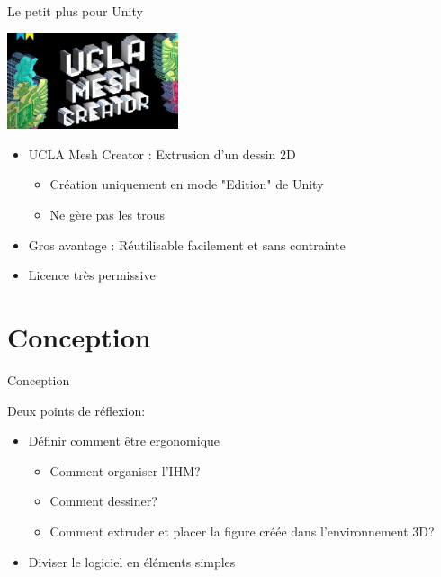 \documentclass[a4paper,10pt]{beamer}
\begin{document}
		\begin{frame}{Le petit plus pour Unity}
			\centerline{\includegraphics[height=80pt]{images/techno/ucla.jpg}}
			
			\begin{itemize}
				\item UCLA Mesh Creator : Extrusion d'un dessin 2D
					\begin{itemize}
						\item Création uniquement en mode "Edition" de Unity
						\item Ne gère pas les trous
					\end{itemize}
				\item Gros avantage : Réutilisable facilement et sans contrainte
				\item Licence très permissive
			\end{itemize}
			
		\end{frame}
		

	
	\section{Conception}	
		\begin{frame}{Conception}
		
		Deux points de réflexion:
			\begin{itemize}
				  \item Définir comment être ergonomique
				  	
				  	\begin{itemize}
				  		\item Comment organiser l'IHM?
				  		\item Comment dessiner?
				  		\item Comment extruder et placer la figure créée dans l'environnement 3D?
				  	\end{itemize}
				  \item Diviser le logiciel en éléments simples
			
			\end{itemize}
		\end{frame}
		
\end{document}
